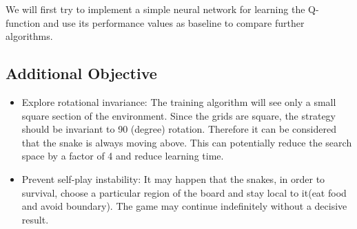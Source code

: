 \documentclass[conference]{IEEEtran}
\begin{document}
We will first try to implement a simple neural network for learning the
Q-function and use its performance values as baseline to compare further algorithms.  \newline\par


\subsection{Additional Objective}
\begin{itemize}
	\item{Explore rotational invariance: The training algorithm will see only a
  small square section of the environment. Since the grids are square, the
  strategy should be invariant to 90 (degree) rotation. Therefore it can be
  considered that the snake is always moving above. This can potentially
  reduce the search space by a factor of 4 and reduce learning time.}
	\item{Prevent self-play instability: It may happen that the snakes, in
  order to survival, choose a particular region of the board and stay local
  to it(eat food and avoid boundary). The game may continue indefinitely
  without a decisive result. }
\end{itemize}
\section*{}
\end{document}
